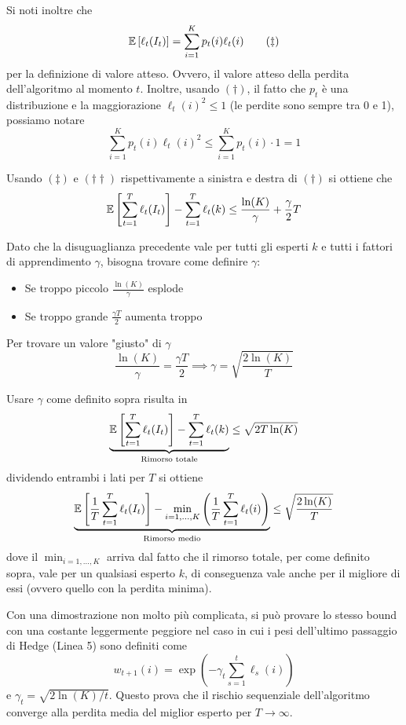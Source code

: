 Si noti inoltre che
\[
\mathbb{E} \left[\ell_t (I_t)\right] = \sum_{i = 1}^K p_t (i) \ell_t (i)  \tag*{$(\ddag)$}
\]
per la definizione di valore atteso. Ovvero, il valore atteso della perdita dell'algoritmo al momento $t$. Inoltre, usando $(\dag)$, il fatto che $p_t$ è una distribuzione e la maggiorazione $\ell_t (i)^2 \leq 1$ (le perdite sono sempre tra 0 e 1), possiamo notare
\[ 
\sum_{i = 1}^K p_t (i) \ell_t (i)^2 \leq \sum_{i = 1}^K p_t (i) \cdot 1 = 1 \tag*{$(\dag \dag)$} 
\]

Usando $(\ddag)$ e $(\dag \dag)$ rispettivamente a sinistra e destra di $(\dag)$ si ottiene che
$$ \mathbb{E} \left[\sum_{t = 1}^T \ell_t (I_t) \right] - \sum_{t = 1}^T \ell_t (k) \leq \frac{\ln (K)}{\gamma} + \frac{\gamma}{2} T $$

Dato che la disuguaglianza precedente vale per tutti gli esperti $k$ e tutti i fattori di apprendimento $\gamma$, bisogna trovare come definire $\gamma$:
\begin{itemize}
	\item Se troppo piccolo $\frac{\ln (K)}{\gamma}$ esplode
	
	\item Se troppo grande $\frac{\gamma T}{2}$ aumenta troppo
\end{itemize}

Per trovare un valore "giusto" di $\gamma$
$$ \frac{\ln (K)}{\gamma} = \frac{\gamma T}{2} \implies \gamma = \sqrt{\frac{2 \ln (K)}{T}} $$

Usare $\gamma$ come definito sopra risulta in
$$ \underbrace{\mathbb{E} \left[\sum_{t = 1}^T \ell_t (I_t) \right] - \sum_{t = 1}^T \ell_t (k)}_{\text{Rimorso totale}} \leq \sqrt{2 T \ln (K)}$$
dividendo entrambi i lati per $T$ si ottiene
$$ \underbrace{\mathbb{E} \left[\frac{1}{T} \sum_{t = 1}^T \ell_t (I_t) \right] - \min_{i = 1, \dots, K} \left(\frac{1}{T} \sum_{t = 1}^T \ell_t (i) \right)}_{\text{Rimorso medio}} \leq \sqrt{\frac{2 \ln (K)}{T}} $$
dove il $\min_{i = 1, \dots, K}$ arriva dal fatto che il rimorso totale, per come definito sopra, vale per un qualsiasi esperto $k$, di conseguenza vale anche per il migliore di essi (ovvero quello con la perdita minima).

Con una dimostrazione non molto più complicata, si può provare lo stesso bound con una costante leggermente peggiore nel caso in cui i pesi dell'ultimo passaggio di Hedge (Linea 5) sono definiti come
$$ w_{t+1}(i)  = \exp \left(- \gamma_t \sum_{s = 1}^t \ell_s (i)\right) $$
e $\gamma_t = \sqrt{2 \ln (K) / t}$. Questo prova che il rischio sequenziale dell'algoritmo converge alla perdita media del miglior esperto per $T \rightarrow \infty$.

